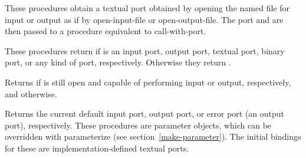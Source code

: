 \begin{entry}{
}

These procedures obtain a
textual port obtained by opening the named file for input or output
as if by {\cf open-input-file} or {\cf open-output-file}.
The port and  are then passed to a procedure equivalent
to {\cf call-with-port}.
\end{entry}

\begin{entry}{
}

These procedures return \schtrue{} if  is an input port, output port,
textual port, binary port, or any
kind of port, respectively.  Otherwise they return \schfalse.

\end{entry}


\begin{entry}{
}

Returns \schtrue{} if  is still open and capable of
performing input or output, respectively, and \schfalse{} otherwise.


\end{entry}


\begin{entry}{
}

Returns the current default input port, output port, or error port (an
output port), respectively.  These procedures are parameter objects, which can be
overridden with {\cf parameterize} (see
section~\ref{make-parameter}).  The initial bindings for these
are implementation-defined textual ports.

\end{entry}


